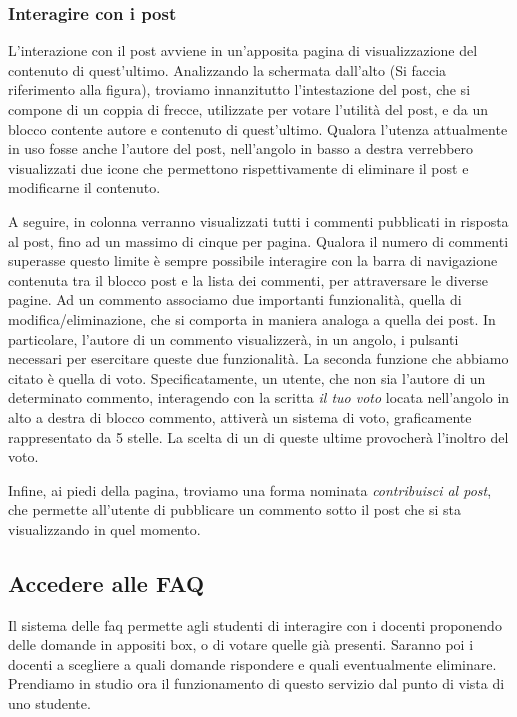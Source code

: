 \documentclass [a4paper,11pt]{book}
\begin{document}
\subsubsection{Interagire con i post}

L'interazione con il post avviene in un'apposita pagina di visualizzazione del contenuto di quest'ultimo. Analizzando la schermata dall'alto (Si faccia riferimento alla figura), troviamo innanzitutto l'intestazione del post, che si compone di un coppia di frecce, utilizzate per votare l'utilità del post, e da un blocco contente autore e contenuto di quest'ultimo. 
Qualora l'utenza attualmente in uso fosse anche l'autore del post, nell'angolo in basso a destra verrebbero visualizzati due icone che permettono rispettivamente di eliminare il post e modificarne il contenuto.

A seguire, in colonna verranno visualizzati tutti i commenti pubblicati in risposta al post, fino ad un massimo di cinque per pagina. Qualora il numero di commenti superasse questo limite è sempre possibile interagire con la barra di navigazione contenuta tra il blocco post e la lista dei commenti, per attraversare le diverse pagine. 
Ad un commento associamo due importanti funzionalità, quella di modifica/eliminazione, che si comporta in maniera analoga a quella dei post. In particolare, l'autore di un commento visualizzerà, in un angolo, i pulsanti necessari per esercitare queste due funzionalità.
La seconda funzione che abbiamo citato è quella di voto. Specificatamente, un utente, che non sia l'autore di un determinato commento, interagendo con la scritta \emph{il tuo voto} locata nell'angolo in alto a destra di blocco commento, attiverà un sistema di voto, graficamente rappresentato da 5 stelle. La scelta di un di queste ultime provocherà l'inoltro del voto.

Infine, ai piedi della pagina, troviamo una forma nominata \emph{contribuisci al post}, che permette all'utente di pubblicare un commento sotto il post che si sta visualizzando in quel momento.
\medskip

\subsection{Accedere alle FAQ}

Il sistema delle faq permette agli studenti di interagire con i docenti proponendo delle domande in appositi box, o di votare quelle già presenti. Saranno poi i docenti a scegliere a quali domande rispondere e quali eventualmente eliminare. Prendiamo in studio ora il funzionamento di questo servizio dal punto di vista di uno studente.
\end{document}
